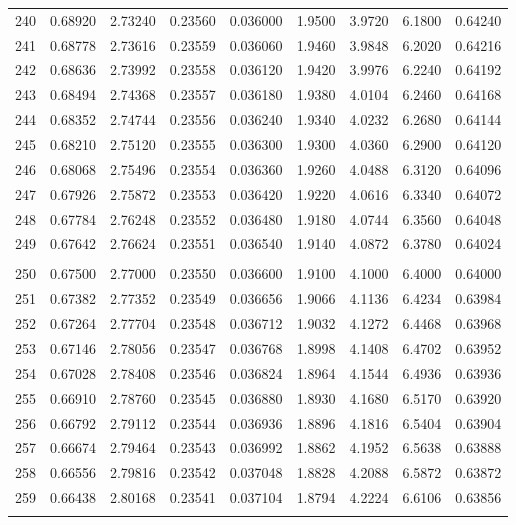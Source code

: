 \documentclass[letter,twosides,10pt]{article}
\begin{document}
\begin{longtable}{|c|c|c|c|c|c|c|c|c|}
240 & 0.68920 & 2.73240 & 0.23560 & 0.036000 & 1.9500 & 3.9720 & 6.1800 & 0.64240 \\
241 & 0.68778 & 2.73616 & 0.23559 & 0.036060 & 1.9460 & 3.9848 & 6.2020 & 0.64216 \\
242 & 0.68636 & 2.73992 & 0.23558 & 0.036120 & 1.9420 & 3.9976 & 6.2240 & 0.64192 \\
243 & 0.68494 & 2.74368 & 0.23557 & 0.036180 & 1.9380 & 4.0104 & 6.2460 & 0.64168 \\
244 & 0.68352 & 2.74744 & 0.23556 & 0.036240 & 1.9340 & 4.0232 & 6.2680 & 0.64144 \\
245 & 0.68210 & 2.75120 & 0.23555 & 0.036300 & 1.9300 & 4.0360 & 6.2900 & 0.64120 \\
246 & 0.68068 & 2.75496 & 0.23554 & 0.036360 & 1.9260 & 4.0488 & 6.3120 & 0.64096 \\
247 & 0.67926 & 2.75872 & 0.23553 & 0.036420 & 1.9220 & 4.0616 & 6.3340 & 0.64072 \\
248 & 0.67784 & 2.76248 & 0.23552 & 0.036480 & 1.9180 & 4.0744 & 6.3560 & 0.64048 \\
249 & 0.67642 & 2.76624 & 0.23551 & 0.036540 & 1.9140 & 4.0872 & 6.3780 & 0.64024 \\
 & & & & & & & & \\
250 & 0.67500 & 2.77000 & 0.23550 & 0.036600 & 1.9100 & 4.1000 & 6.4000 & 0.64000 \\
251 & 0.67382 & 2.77352 & 0.23549 & 0.036656 & 1.9066 & 4.1136 & 6.4234 & 0.63984 \\
252 & 0.67264 & 2.77704 & 0.23548 & 0.036712 & 1.9032 & 4.1272 & 6.4468 & 0.63968 \\
253 & 0.67146 & 2.78056 & 0.23547 & 0.036768 & 1.8998 & 4.1408 & 6.4702 & 0.63952 \\
254 & 0.67028 & 2.78408 & 0.23546 & 0.036824 & 1.8964 & 4.1544 & 6.4936 & 0.63936 \\
255 & 0.66910 & 2.78760 & 0.23545 & 0.036880 & 1.8930 & 4.1680 & 6.5170 & 0.63920 \\
256 & 0.66792 & 2.79112 & 0.23544 & 0.036936 & 1.8896 & 4.1816 & 6.5404 & 0.63904 \\
257 & 0.66674 & 2.79464 & 0.23543 & 0.036992 & 1.8862 & 4.1952 & 6.5638 & 0.63888 \\
258 & 0.66556 & 2.79816 & 0.23542 & 0.037048 & 1.8828 & 4.2088 & 6.5872 & 0.63872 \\
259 & 0.66438 & 2.80168 & 0.23541 & 0.037104 & 1.8794 & 4.2224 & 6.6106 & 0.63856 \\
 & & & & & & & & \\

\end{longtable}
\end{document}
